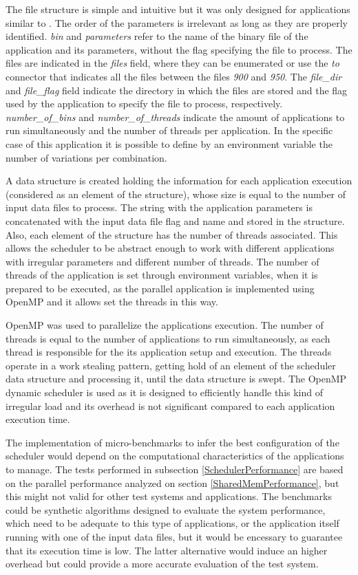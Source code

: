 The file structure is simple and intuitive but it was only designed for applications similar to \tth. The order of the parameters is irrelevant as long as they are properly identified. \textit{bin} and \textit{parameters} refer to the name of the binary file of the application and its parameters, without the flag specifying the file to process. The files are indicated in the \textit{files} field, where they can be enumerated or use the \textit{to} connector that indicates all the files between the files \textit{900} and \textit{950}. The \textit{file\_dir} and \textit{file\_flag} field indicate the directory in which the files are stored and the flag used by the application to specify the file to process, respectively. \textit{number\_of\_bins} and \textit{number\_of\_threads} indicate the amount of applications to run simultaneously and the number of threads per application. In the specific case of this application it is possible to define by an environment variable the number of variations per combination.

A data structure is created holding the information for each application execution (considered as an element of the structure), whose size is equal to the number of input data files to process. The string with the application parameters is concatenated with the input data file flag and name and stored in the structure. Also, each element of the structure has the number of threads associated. This allows the scheduler to be abstract enough to work with different applications with irregular parameters and different number of threads. The number of threads of the application is set through environment variables, when it is prepared to be executed, as the parallel \tth application is implemented using OpenMP and it allows set the threads in this way.

OpenMP was used to parallelize the applications execution. The number of threads is equal to the number of applications to run simultaneously, as each thread is responsible for the its application setup and execution. The threads operate in a work stealing pattern, getting hold of an element of the scheduler data structure and processing it, until the data structure is swept. The OpenMP dynamic scheduler is used as it is designed to efficiently handle this kind of irregular load and its overhead is not significant compared to each application execution time.

The implementation of micro-benchmarks to infer the best configuration of the scheduler would depend on the computational characteristics of the applications to manage. The tests performed in subsection \ref{SchedulerPerformance} are based on the parallel \tth performance analyzed on section \ref{SharedMemPerformance}, but this might not valid for other test systems and applications. The benchmarks could be synthetic algorithms designed to evaluate the system performance, which need to be adequate to this type of applications, or the application itself running with one of the input data files, but it would be encessary to guarantee that its execution time is low. The latter alternative would induce an higher overhead but could provide a more accurate evaluation of the test system.

